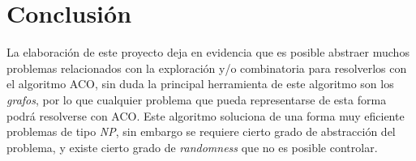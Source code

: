 \documentclass[12pt, a4paper]{article}
\begin{document}
\section{Conclusión}
La elaboración de este proyecto deja en evidencia que es posible abstraer muchos problemas relacionados con la exploración y/o combinatoria para resolverlos con el algoritmo ACO, sin duda la principal herramienta de este algoritmo son los \emph{grafos}, por lo que cualquier problema que pueda representarse de esta forma podrá resolverse con ACO. Este algoritmo soluciona de una forma muy eficiente problemas de tipo \emph{NP}, sin embargo se requiere cierto grado de abstracción del problema, y existe cierto grado de \emph{randomness} que no es posible controlar.



\nocite{*}
\end{document}
